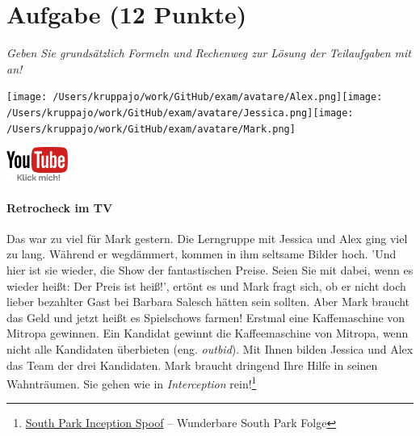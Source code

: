 \documentclass[a4paper, 9pt]{scrartcl}\usepackage[]{graphicx}\usepackage[]{xcolor}
\begin{document}
\section{Aufgabe \hfill (12 Punkte)}

\textit{Geben Sie grundsätzlich Formeln und Rechenweg zur Lösung der Teilaufgaben mit an!} \\[1Ex]
 

 
\ifcollection
\begin{flushright}
\tiny\vspace{-3Ex}
\textbf{\examinhaltstart}
\exammodulemathstat
\vspace{-4Ex}
\end{flushright}
\begin{minipage}[t]{0.5\textwidth}
\texttt{[image: /Users/kruppajo/work/GitHub/exam/avatare/Alex.png]}\hspace{-4mm}\texttt{[image: /Users/kruppajo/work/GitHub/exam/avatare/Jessica.png]}\hspace{-4mm}\texttt{[image: /Users/kruppajo/work/GitHub/exam/avatare/Mark.png]}
\end{minipage}
\begin{minipage}[t]{0.5\textwidth}
\hfill
\href{https://youtu.be/8Pb2sKUIMyk}{\includegraphics[width = 2cm]{img/youtube}}
\end{minipage}
\fi



\ifcollection
\paragraph{Retrocheck im TV}
\fi




Das war zu viel für Mark gestern. Die Lerngruppe mit Jessica und Alex ging viel zu lang. Während er wegdämmert, kommen in ihm seltsame Bilder hoch. 'Und hier ist sie wieder, die Show der fantastischen Preise. Seien Sie mit dabei, wenn es wieder heißt: Der Preis ist heiß!', ertönt es und Mark fragt sich, ob er nicht doch lieber bezahlter Gast bei Barbara Salesch hätten sein sollten. Aber Mark braucht das Geld und jetzt heißt es Spielschows farmen! Erstmal eine Kaffemaschine von Mitropa gewinnen. Ein Kandidat gewinnt die Kaffeemaschine von Mitropa, wenn nicht alle Kandidaten überbieten (eng. \textit{outbid}). Mit Ihnen bilden Jessica und Alex das Team der drei Kandidaten. Mark braucht dringend Ihre Hilfe in seinen Wahnträumen. Sie gehen wie in \textit{Interception} rein!\footnote{\href{https://www.youtube.com/watch?v=3RhxyHMs-w8}{South Park Inception Spoof} -- Wunderbare South Park Folge}
\end{document}
